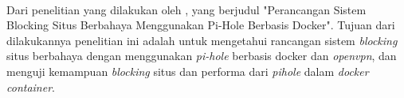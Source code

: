 \documentclass[../PROPOSAL_PRA_SKRIPSI_ALDZIKRI_DWIJAYANTO_PRATHAMA.tex]{subfiles}
\begin{document}
  \paragraph*{} Dari penelitian yang dilakukan oleh
  \cite{uni2021}, yang berjudul "Perancangan Sistem Blocking
  Situs Berbahaya Menggunakan Pi-Hole Berbasis Docker".
  Tujuan dari dilakukannya penelitian ini adalah untuk
  mengetahui rancangan sistem \textit{blocking} situs
  berbahaya dengan menggunakan \textit{pi-hole} berbasis
  docker dan \textit{openvpn}, dan menguji kemampuan
  \textit{blocking} situs dan performa dari \textit{pihole}
  dalam \textit{docker container}.
\end{document}
